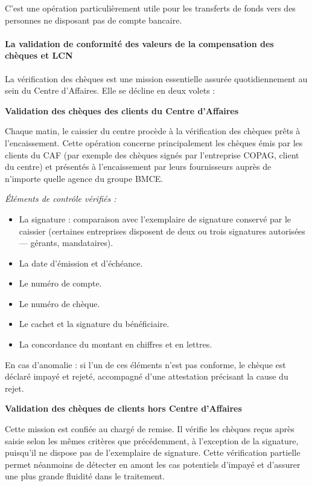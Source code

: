 C'est une opération particulièrement utile pour les transferts de fonds vers des personnes ne disposant pas de compte bancaire.

\paragraph{La validation de conformité des valeurs de la compensation des chèques et LCN}

La vérification des chèques est une mission essentielle assurée quotidiennement au sein du Centre d'Affaires. Elle se décline en deux volets :

\medskip\textbf{Validation des chèques des clients du Centre d'Affaires}

Chaque matin, le caissier du centre procède à la vérification des chèques prêts à l'encaissement. Cette opération concerne principalement les chèques émis par les clients du CAF (par exemple des chèques signés par l'entreprise COPAG, client du centre) et présentés à l'encaissement par leurs fournisseurs auprès de n'importe quelle agence du groupe BMCE.

\medskip\textit{Éléments de contrôle vérifiés :}
\begin{itemize}
  \item La signature : comparaison avec l'exemplaire de signature conservé par le caissier (certaines entreprises disposent de deux ou trois signatures autorisées --- gérants, mandataires).
  \item La date d'émission et d'échéance.
  \item Le numéro de compte.
  \item Le numéro de chèque.
  \item Le cachet et la signature du bénéficiaire.
  \item La concordance du montant en chiffres et en lettres.
\end{itemize}

En cas d'anomalie : si l'un de ces éléments n'est pas conforme, le chèque est déclaré impayé et rejeté, accompagné d'une attestation précisant la cause du rejet.

\medskip\textbf{Validation des chèques de clients hors Centre d'Affaires}

Cette mission est confiée au chargé de remise. Il vérifie les chèques reçus après saisie selon les mêmes critères que précédemment, à l'exception de la signature, puisqu'il ne dispose pas de l'exemplaire de signature. Cette vérification partielle permet néanmoins de détecter en amont les cas potentiels d'impayé et d'assurer une plus grande fluidité dans le traitement.


